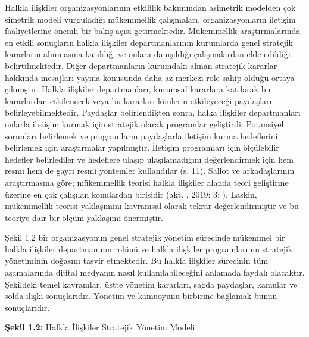 \documentclass[
]{book}
\begin{document}
Halkla ilişkiler organizasyonlarının etkililik bakımından asimetrik modelden çok simetrik modeli vurguladığı mükemmellik çalışmaları, organizasyonların iletişim faaliyetlerine önemli bir bakış açısı getirmektedir.\citep{grunig1995models} Mükemmellik araştırmalarında en etkili sonuçların halkla ilişkiler departmanlarının kurumlarda genel stratejik kararların alınmasına katıldığı ve onlara danışıldığı çalışmalardan elde edildiği belirtilmektedir. Diğer departmanların kurumdaki alınan stratejik kararlar hakkında mesajları yayma konusunda daha az merkezi role sahip olduğu ortaya çıkmıştır. Halkla ilişkiler departmanları, kurumsal kararlara katılarak bu kararlardan etkilenecek veya bu kararları kimlerin etkileyeceği paydaşları belirleyebilmektedir. Paydaşlar belirlendikten sonra, halka ilişkiler departmanları onlarla iletişim kurmak için stratejik olarak programlar geliştirdi. Potansiyel sorunları belirlemek ve programların paydaşlarla iletişim kurma hedeflerini belirlemek için araştırmalar yapılmıştır. İletişim programları için ölçülebilir hedefler belirlediler ve hedeflere ulaşıp ulaşılamadığını değerlendirmek için hem resmi hem de gayri resmi yöntemler kullandılar (s. 11).\citep{grunig2009paradigms} Sallot ve arkadaşlarının araştırmasına göre; mükemmellik teorisi halkla ilişkiler alanda teori geliştirme üzerine en çok çalışılan konulardan birisidir (akt. \citet{kus2019suriyeli}, 2019: 3; \citet{sallot2009aardvark}). Laskin, mükemmellik teorisi yaklaşımını kavramsal olarak tekrar değerlendirmiştir ve bu teoriye dair bir ölçüm yaklaşımı önermiştir.\citep{laskin2012public}

Şekil 1.2 \citet{grunig2009paradigms} bir organizasyonun genel stratejik yönetim sürecinde mükemmel bir halkla ilişkiler departmanının rolünü ve halkla ilişkiler programlarının stratejik yönetiminin doğasını tasvir etmektedir. Bu halkla ilişkiler sürecinin tüm aşamalarında dijital medyanın nasıl kullanılabileceğini anlamada faydalı olacaktır. Şekildeki temel kavramlar, üstte yönetim kararları, sağda paydaşlar, kamular ve solda ilişki sonuçlarıdır. Yönetim ve kamuoyunu birbirine bağlamak bunun sonuçlarıdır.

\textbf{Şekil 1.2:} Halkla İlişkiler Stratejik Yönetim Modeli.
\end{document}
